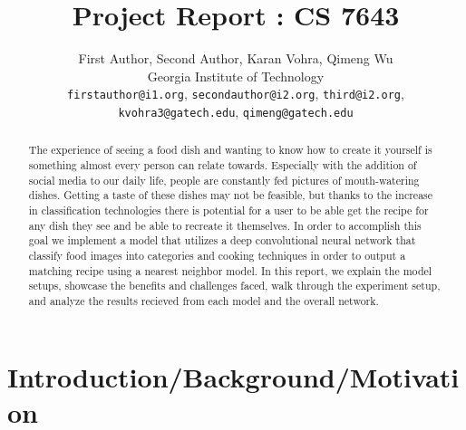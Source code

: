 \documentclass[10pt,twocolumn,letterpaper]{article}
\begin{document}
\title{Project Report : CS 7643}

\author{First Author, Second Author, Karan Vohra, Qimeng Wu\\
Georgia Institute of Technology\\
{\tt\small firstauthor@i1.org}, {\tt\small secondauthor@i2.org}, {\tt\small third@i2.org}, {\tt\small kvohra3@gatech.edu}, {\tt\small  qimeng@gatech.edu}
}
\maketitle

\begin{abstract}
   The experience of seeing a food dish and wanting to know how to create it yourself is something almost every person can relate towards. Especially with the addition of social media to our daily life, people are constantly fed pictures of mouth-watering dishes. Getting a taste of these dishes may not be feasible, but thanks to the increase in classification technologies there is potential for a user to be able get the recipe for any dish they see and be able to recreate it themselves. In order to accomplish this goal we implement a model that utilizes a deep convolutional neural network that classify food images into categories and cooking techniques in order to output a matching recipe using a nearest neighbor model. In this report, we explain the model setups, showcase the benefits and challenges faced, walk through the experiment setup, and analyze the results recieved from each model and the overall network. 
\end{abstract}

\section{Introduction/Background/Motivation}
\end{document}
